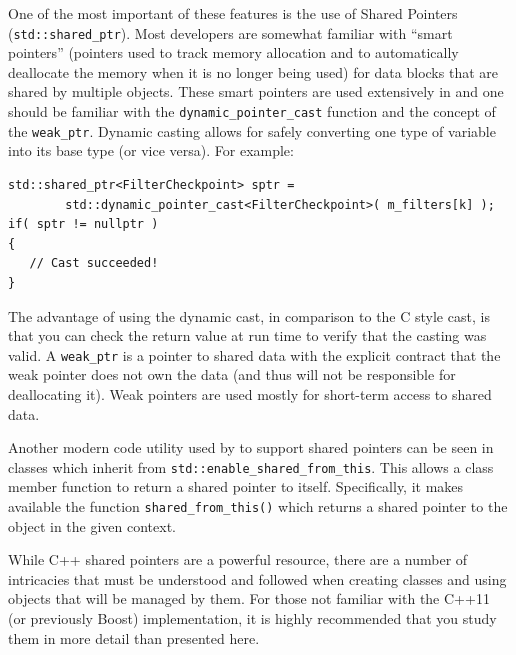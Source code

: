 One of the most important of these features is
the use of Shared Pointers (\lstinline|std::shared_ptr|).  Most developers are
somewhat familiar with ``smart pointers'' (pointers used to track
memory allocation and to automatically deallocate the memory when it
is no longer being used) for data blocks that are shared by multiple
objects. These smart pointers are used extensively in {\nek} and
one should be familiar with the \lstinline|dynamic_pointer_cast| function
and the concept of the \lstinline|weak_ptr|.  Dynamic casting allows for safely
converting one type of variable into its base type (or vice
versa). For example:
\begin{lstlisting}
std::shared_ptr<FilterCheckpoint> sptr =
        std::dynamic_pointer_cast<FilterCheckpoint>( m_filters[k] );
if( sptr != nullptr ) 
{ 
   // Cast succeeded!
}
\end{lstlisting}

The advantage of using the dynamic cast, in comparison to the C style
cast, is that you can check the return value at run time to verify
that the casting was valid.  A \lstinline|weak_ptr| is a pointer to shared
data with the explicit contract that the weak pointer does not own
the data (and thus will not be responsible for deallocating it).
Weak pointers are used mostly for short-term access to shared data.

Another modern code utility used by {\nek} to support shared
pointers can be seen in {\nek} classes which inherit from
\lstinline|std::enable_shared_from_this|. This allows a class member function to return a shared pointer to itself. Specifically, it makes available the function \lstinline|shared_from_this()| which returns a shared pointer to the object in the given context.

While C++ shared pointers are a powerful resource, there are a
number of intricacies that must be understood and followed when
creating classes and using objects that will be managed by them.
For those not familiar with the C++11 (or previously Boost)
implementation, it is highly recommended that you study them in more
detail than presented here.
  
